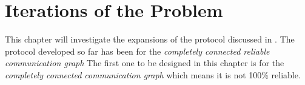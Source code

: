 \chapter{Iterations of the Problem}
This chapter will investigate the expansions of the protocol discussed in .
The protocol developed so far has been for the \textit{completely connected reliable communication graph}
The first one to be designed in this chapter is for the \textit{completely connected communication graph} which means it is not 100\% reliable.

